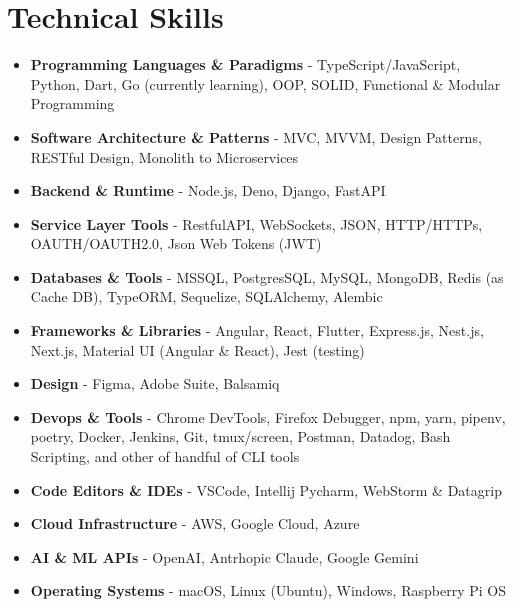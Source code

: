 \section{Technical Skills}
{
	\normalsize
	\begin{itemize}[topsep=0pt, partopsep=0pt, itemsep=0pt, parsep=0pt]
		\item \textbf{Programming Languages \& Paradigms} - TypeScript/JavaScript, Python, Dart, Go (currently learning), OOP, SOLID, Functional \& Modular Programming
		\item \textbf{Software Architecture \& Patterns} - MVC, MVVM, Design Patterns, RESTful Design, Monolith to Microservices
		\item \textbf{Backend \& Runtime} - Node.js, Deno, Django, FastAPI
		\item \textbf{Service Layer Tools} - RestfulAPI, WebSockets, JSON, HTTP/HTTPs, OAUTH/OAUTH2.0, Json Web Tokens (JWT)
		\item \textbf{Databases \& Tools} - MSSQL, PostgresSQL, MySQL, MongoDB, Redis (as Cache DB), TypeORM, Sequelize, SQLAlchemy, Alembic
		\item \textbf{Frameworks \& Libraries} - Angular, React, Flutter, Express.js, Nest.js, Next.js, Material UI (Angular \& React), Jest (testing)
		\item \textbf{Design} - Figma, Adobe Suite, Balsamiq
		\item \textbf{Devops \& Tools} - Chrome DevTools, Firefox Debugger, npm, yarn, pipenv, poetry, Docker, Jenkins, Git, tmux/screen, Postman, Datadog, Bash Scripting, and other of handful of CLI tools
		\item \textbf{Code Editors \& IDEs} - VSCode, Intellij Pycharm, WebStorm \& Datagrip
		\item \textbf{Cloud Infrastructure} - AWS, Google Cloud, Azure
		\item \textbf{AI \& ML APIs} - OpenAI, Antrhopic Claude, Google Gemini
		\item \textbf{Operating Systems} - macOS, Linux (Ubuntu), Windows, Raspberry Pi OS
	\end{itemize}
}